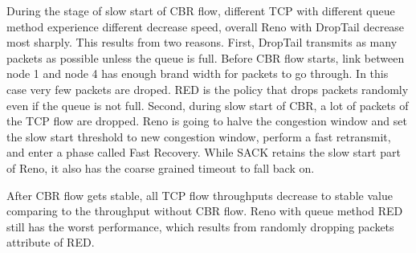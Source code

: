 \documentclass[10pt, conference]{lib/IEEEtran}
\begin{document}
During the stage of slow start of CBR flow, different TCP with 
different queue method experience different decrease speed, overall 
Reno with DropTail decrease most sharply. This results from two 
reasons. First, DropTail transmits as many packets as possible unless 
the queue is full. Before CBR flow starts, link between node 1 and 
node 4 has enough brand width for packets to go through. In this case 
very few packets are droped. RED is the policy that drops packets 
randomly even if the queue is not full. Second, during slow start of 
CBR, a lot of packets of the TCP flow are dropped. Reno is going to 
halve the congestion window and set the slow start threshold to new 
congestion window, perform a fast retransmit, and enter a phase called 
Fast Recovery. While SACK retains the slow start part of Reno, it also 
has the coarse grained timeout to fall back on.


After CBR flow gets stable, all TCP flow throughputs decrease to 
stable value comparing to the throughput without CBR flow. Reno with 
queue method RED still has the worst performance, which results from 
randomly dropping packets attribute of RED.
\end{document}
